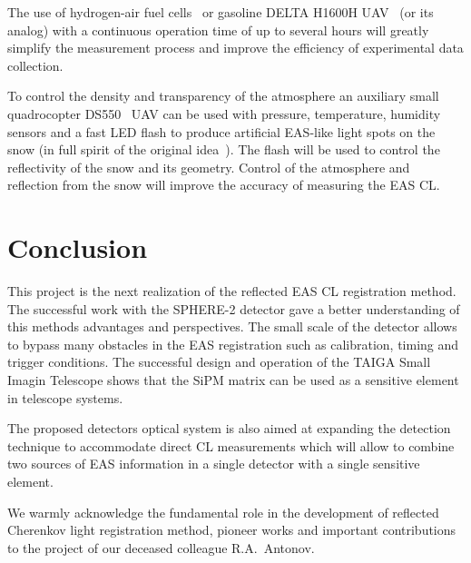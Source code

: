 \documentclass[a4paper,11pt]{article}
\begin{document}
The use of hydrogen-air fuel cells~\cite{UAVair} or gasoline DELTA H1600H UAV~\cite{UAVoil} (or its analog) with a continuous operation time of up to several hours will greatly simplify the measurement process and improve the efficiency of experimental data collection.

To control the density and transparency of the atmosphere an auxiliary small quadrocopter DS550~\cite{dronestroy} UAV can be used with pressure, temperature, humidity sensors and a fast LED flash to produce artificial EAS-like light spots on the snow (in full spirit of the original idea~\cite{Chu74}).
The flash will be used to control the reflectivity of the snow and its geometry. Control of the atmosphere and reflection from the snow will improve the accuracy of measuring the EAS CL.

\section{Conclusion}

This project is the next realization of the reflected EAS CL registration method. The successful work with the SPHERE-2 detector gave a better understanding of this methods advantages and perspectives. The small scale of the detector allows to bypass many obstacles in the EAS registration such as calibration, timing and trigger conditions. The successful design and operation of the TAIGA Small Imagin Telescope shows that the SiPM matrix can be used as a sensitive element in telescope systems.

The proposed detectors optical system is also aimed at expanding the detection technique to accommodate direct CL measurements which will allow to combine two sources of EAS information in a single detector with a single sensitive element.


\acknowledgments
We warmly acknowledge the fundamental role in the development of reflected Cherenkov light registration method, pioneer works and important contributions to the project of our deceased colleague R.A.~Antonov.


\end{document}
